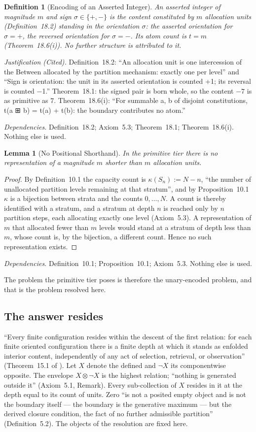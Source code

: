 \documentclass[pdflatex,sn-mathphys-num]{sn-jnl}
\theoremstyle{thmstyleone}%
\newtheorem{lemma}[theorem]{Lemma}
\theoremstyle{thmstyletwo}%
\theoremstyle{thmstylethree}%
\newtheorem{definition}{Definition}[section]
\newtheorem{lemma}[theorem]{Lemma}
\newtheorem{definition}{Definition}[section]
\newcommand{\PA}{\cite{Swanagon2026PA}}
\newcommand{\q}[1]{``#1''}        %
\newcommand{\deps}[1]{\par\begin{sloppypar}\noindent\emph{Dependencies.} #1 Nothing else is used.\end{sloppypar}}
\begin{document}
\begin{definition}[Encoding of an Asserted Integer]\label{def:encoding}
An asserted integer of magnitude $m$ and sign $\sigma\in\{+,-\}$ is the content constituted by $m$ allocation units (Definition~18.2) standing in the orientation $\sigma$: the asserted orientation for $\sigma=+$, the reversed orientation for $\sigma=-$. Its atom count is $t=m$ (Theorem~18.6(i)). No further structure is attributed to it.
\end{definition}
\noindent\emph{Justification (Cited).} Definition~18.2: \q{An allocation unit is one intercession of the Between allocated by the partition mechanism: exactly one per level} and \q{Sign is orientation: the unit in its asserted orientation is counted +1; its reversal is counted −1.} Theorem~18.1: the signed pair is born whole, so the content $-7$ is as primitive as $7$. Theorem~18.6(i): \q{For summable a, b of disjoint constitutions, t(a ⊞ b) = t(a) + t(b): the boundary contributes no atom.}
\deps{Definition~18.2; Axiom~5.3; Theorem~18.1; Theorem~18.6(i).}

\begin{lemma}[No Positional Shorthand]\label{lem:shorthand}
In the primitive tier there is no representation of a magnitude $m$ shorter than $m$ allocation units.
\end{lemma}
\begin{proof}
By Definition~10.1 the capacity count is $\kappa(S_n):=N-n$, \q{the number of unallocated partition levels remaining at that stratum}, and by Proposition~10.1 $\kappa$ is a bijection between strata and the counts $0,\dots,N$. A count is thereby identified with a stratum, and a stratum at depth $n$ is reached only by $n$ partition steps, each allocating exactly one level (Axiom~5.3). A representation of $m$ that allocated fewer than $m$ levels would stand at a stratum of depth less than $m$, whose count is, by the bijection, a different count. Hence no such representation exists.
\end{proof}
\deps{Definition~10.1; Proposition~10.1; Axiom~5.3.}

\noindent The problem the primitive tier poses is therefore the unary-encoded problem, and that is the problem resolved here.

\subsection{The answer resides}
\q{Every finite configuration resides within the descent of the first relation: for each finite oriented configuration there is a finite depth at which it stands as enfolded interior content, independently of any act of selection, retrieval, or observation} (Theorem~15.1 of \PA). Let $X$ denote the defined and $\neg X$ its componentwise opposite. The envelope $X\otimes\neg X$ is the highest relation; \q{nothing is generated outside it} (Axiom~5.1, Remark). Every sub-collection of $X$ resides in it at the depth equal to its count of units. Zero \q{is not a posited empty object and is not the boundary itself --- the boundary is the generative maximum --- but the derived closure condition, the fact of no further admissible partition} (Definition~5.2). The objects of the resolution are fixed here.
\end{document}
